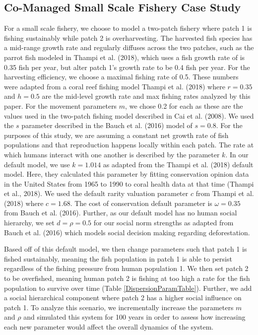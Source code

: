 \documentclass[
  12pt,
]{article}
\begin{document}
\hypertarget{co-managed-small-scale-fishery-case-study}{%
\subsection{Co-Managed Small Scale Fishery Case Study}\label{co-managed-small-scale-fishery-case-study}}

For a small scale fishery, we choose to model a two-patch fishery where patch 1 is fishing sustainably while patch 2 is overharvesting. The harvested fish species has a mid-range growth rate and regularly diffuses across the two patches, such as the parrot fish modeled in Thampi et al. (2018), which uses a fish growth rate of is 0.35 fish per year, but alter patch 1's growth rate to be 0.4 fish per year. For the harvesting efficiency, we choose a maximal fishing rate of 0.5. These numbers were adapted from a coral reef fishing model Thampi et al. (2018) where \(r = 0.35\) and \(h = 0.5\) are the mid-level growth rate and max fishing rates analyzed by this paper. For the movement parameters \(m\), we chose 0.2 for each as these are the values used in the two-patch fishing model described in Cai et al. (2008). We used the \(s\) parameter described in the Bauch et al. (2016) model of \(s = 0.8\). For the purposes of this study, we are assuming a constant net growth rate of fish populations and that reproduction happens locally within each patch. The rate at which humans interact with one another is described by the parameter \(k\). In our default model, we use \(k = 1.014\) as adapted from the Thampi et al. (2018) default model. Here, they calculated this parameter by fitting conservation opinion data in the United States from 1965 to 1990 to coral health data at that time (Thampi et al., 2018). We used the default rarity valuation parameter \(c\) from Thampi et al. (2018) where \(c = 1.68\). The cost of conservation default parameter is \(\omega = 0.35\) from Bauch et al. (2016). Further, as our default model has no human social hierarchy, we set \(d = \rho = 0.5\) for our social norm strengths as adapted from Bauch et al. (2016) which models social decision making regarding deforestation.

Based off of this default model, we then change parameters such that patch 1 is fished sustainably, meaning the fish population in patch 1 is able to persist regardless of the fishing pressure from human population 1. We then set patch 2 to be overfished, meaning human patch 2 is fishing at too high a rate for the fish population to survive over time (Table \ref{DispersionParamTable}). Further, we add a social hierarchical component where patch 2 has a higher social influence on patch 1. To analyze this scenario, we incrementally increase the parameters \(m\) and \(\rho\) and simulated this system for 100 years in order to assess how increasing each new parameter would affect the overall dynamics of the system.
\end{document}

